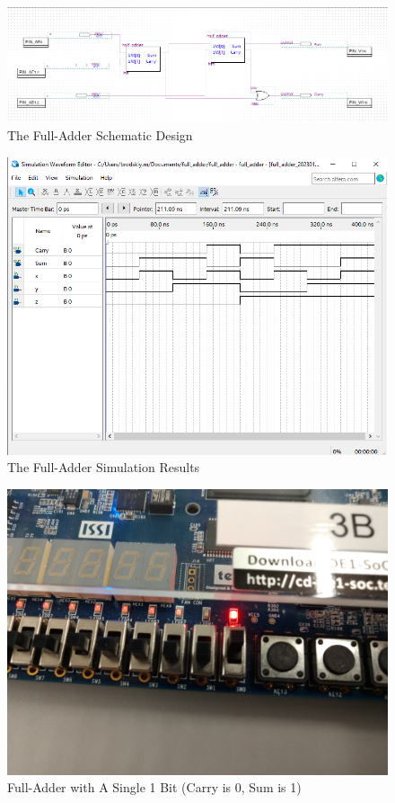 \documentclass[
	letterpaper, %
	10pt, %
]{CSUniSchoolLabReport}
\begin{document}
\begin{figure}[h!]
  \centering
  \includegraphics[width=.9\textwidth]{Figures/FullAdderDesign.png}
  \caption{The Full-Adder Schematic Design}
  \label{fig:3}
\end{figure}

\begin{figure}[h!]
  \centering
  \includegraphics[width=.9\textwidth]{Figures/FullAddSim.png}
  \caption{The Full-Adder Simulation Results}
  \label{fig:4}
\end{figure}

\begin{figure}[h!]
  \centering
  \includegraphics[width=.9\textwidth]{Figures/FullAdd1.jpg}
  \caption{Full-Adder with A Single 1 Bit (Carry is 0, Sum is 1)}
  \label{fig:5}
\end{figure}
\end{document}
